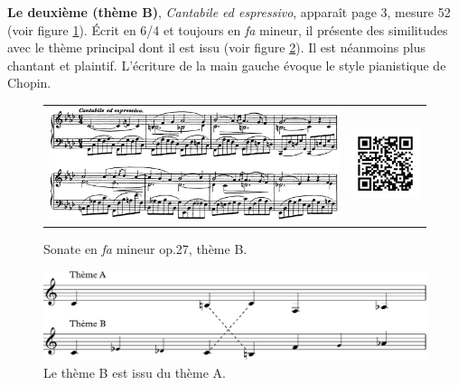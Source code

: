 \textbf{Le deuxième (thème B)}, \emph{Cantabile ed espressivo}, apparaît page 3, mesure 52 (voir figure \ref{sonate-theme-2}). Écrit en 6/4 et toujours en \emph{fa} mineur, il présente des similitudes avec le thème principal dont il est issu (voir figure \ref{sonate-theme-1-vs-2}). Il est néanmoins plus chantant et plaintif. L'écriture de la main gauche évoque le style pianistique de Chopin.

\begin{figure}[!ht]
  \begin{bigcenter}
    \vspace*{0.2cm}
    \begin{tabular}{lr}
      \includegraphics[width=12.5cm, keepaspectratio]{sonate-theme-B.png}
      &
      \includegraphics[width=3cm, keepaspectratio]{op1-qr.png}
    \end{tabular}
  \end{bigcenter}
  \caption{\label{sonate-theme-2}Sonate en \emph{fa} mineur op.27, thème B.}
\end{figure}

\begin{figure}[!ht]
  \begin{bigcenter}
      \includegraphics[width=12.75cm, keepaspectratio]{sonate-theme-A-vs-B.pdf}\vspace{-0.5cm}
  \end{bigcenter}
  \caption{\label{sonate-theme-1-vs-2}Le thème B est issu du thème A.}
\end{figure}

